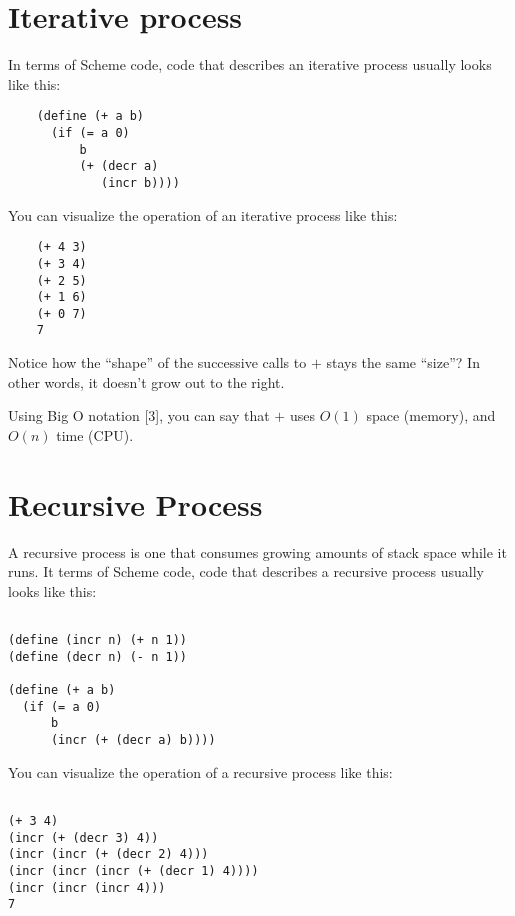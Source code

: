 \documentclass[12pt,openright,draft]{book}
\begin{document}

\section{Iterative process}

In terms of Scheme code, code that describes an iterative process
usually looks like this:

\begin{verbatim}
    (define (+ a b)
      (if (= a 0)
          b
          (+ (decr a)
             (incr b))))
\end{verbatim}

You can visualize the operation of an iterative process like this:

\begin{verbatim}
    (+ 4 3)
    (+ 3 4)
    (+ 2 5)
    (+ 1 6)
    (+ 0 7)
    7
\end{verbatim}

Notice how the ``shape'' of the successive calls to $+$ stays the same
``size''?  In other words, it doesn't grow out to the right.

Using Big O notation [3], you can say that $+$ uses $O(1)$ space
(memory), and $O(n)$ time (CPU).

\section{Recursive Process}

A recursive process is one that consumes growing amounts of stack
space while it runs.  It terms of Scheme code, code that describes a
recursive process usually looks like this:

\begin{verbatim}

(define (incr n) (+ n 1))
(define (decr n) (- n 1))

(define (+ a b)
  (if (= a 0)
      b
      (incr (+ (decr a) b))))

\end{verbatim}

You can visualize the operation of a recursive process like this:

\begin{verbatim}

(+ 3 4)
(incr (+ (decr 3) 4))
(incr (incr (+ (decr 2) 4)))
(incr (incr (incr (+ (decr 1) 4))))
(incr (incr (incr 4)))
7

\end{verbatim}
\end{document}
